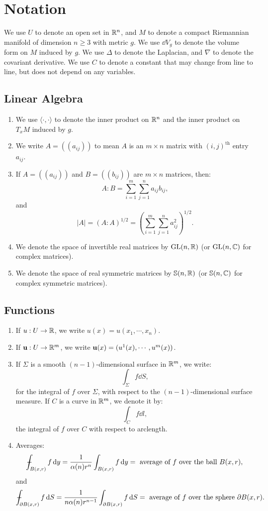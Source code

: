 \section{Notation}

We use $U$ to denote an open set in $\mathbb{R}^n$, and $M$ to denote a compact Riemannian manifold of dimension $n \ge 3$ with metric $g$. We use $\dd{V}_g$ to denote the volume form on $M$ induced by $g$. We use $\Delta$ to denote the Laplacian, and $\nabla$ to denote the covariant derivative. We use $C$ to denote a constant that may change from line to line, but does not depend on any variables.

\subsection{Linear Algebra}

\begin{enumerate}
  \item We use $\langle\cdot, \cdot\rangle$ to denote the inner product on $\mathbb{R}^n$ and the inner product on $T_xM$ induced by $g$.
  \item We write $A = ((a_{ij}))$ to mean $A$ is an $m \times n$ matrix with $(i, j)^{\text{th}}$ entry $a_{ij}$.
  \item If $A = ((a_{ij}))$ and $B = ((b_{ij}))$ are $m \times n$ matrices, then:
    \[%
      A : B = \sum_{i=1}^m \sum_{j=1}^n a_{ij} b_{ij}
    ,\]%
    and
    \[%
      |A| = (A : A)^{1/2} = \left(\sum_{i=1}^m \sum_{j=1}^n a_{ij}^2\right)^{1/2}
    .\]%
  \item We denote the space of invertible real matrices by $\operatorname{GL}(n, \mathbb{R})$ (or $\operatorname{GL}(n, \mathbb{C})$ for complex matrices).
  \item We denote the space of real symmetric matrices by $\mathbb{S}(n, \mathbb{R})$ (or $\mathbb{S}(n, \mathbb{C})$ for complex symmetric matrices).
\end{enumerate}

\subsection{Functions}

\begin{enumerate}
  \item If $u : U \rightarrow \mathbb{R}$, we write $u(x) = u(x_1, \cdots, x_n)$.
  \item If $\mathbf{u} : U \rightarrow \mathbb{R}^m$, we write $\mathbf{u}(x) = (u^1(x), \cdots, u^m(x))$.
  \item If $\Sigma$ is a smooth $(n-1)$-dimensional surface in $\mathbb{R}^m$, we write:
    \[%
      \int_\Sigma f \dd{S}
    ,\]%
    for the integral of $f$ over $\Sigma$, with respect to the $(n-1)$-dimensional surface measure. If $C$ is a curve in $\mathbb{R}^m$, we denote it by:
    \[%
      \int_C f \dd{l}
    ,\]%
    the integral of $f$ over $C$ with respect to arclength.
  \item Averages:
    \[%
      \dashint_{B(x,r)} f \dy = \frac{1}{\alpha(n)r^n} \int_{B(x,r)} f \dy =~\text{average of $f$ over the ball $B(x,r)$}
    ,\]%
    and
    \[%
      \dashint_{\partial B(x,r)} f \dd{S} = \frac{1}{n\alpha(n)r^{n-1}} \int_{\partial B(x,r)} f \dd{S} =~\text{average of $f$ over the sphere $\partial B(x,r)$}
    .\]%
\end{enumerate}

